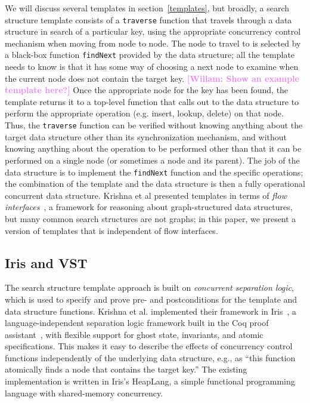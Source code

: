 \documentclass[a4paper,UKenglish,cleveref, autoref, thm-restate]{lipics-v2021}
\newcommand{\wm}[1]{\textbf{\textcolor{violet}{[Willam: #1]}}}
\begin{document}
We will discuss several templates in section~\ref{templates}, but broadly, a search structure template consists of a \lstinline{traverse} function that travels through a data structure in search of a particular key, using the appropriate concurrency control mechanism when moving from node to node. The node to travel to is selected by a black-box function \lstinline{findNext} provided by the data structure; all the template needs to know is that it has some way of choosing a next node to examine when the current node does not contain the target key. \wm{Show an example template here?} Once the appropriate node for the key has been found, the template returns it to a top-level function that calls out to the data structure to perform the appropriate operation (e.g. insert, lookup, delete) on that node. Thus, the \lstinline{traverse} function can be verified without knowing anything about the target data structure other than its synchronization mechanism, and without knowing anything about the operation to be performed other than that it can be performed on a single node (or sometimes a node and its parent). The job of the data structure is to implement the \lstinline{findNext} function and the specific operations; the combination of the template and the data structure is then a fully operational concurrent data structure. Krishna et al presented templates in terms of \emph{flow interfaces}~\cite{krishna2017flow}, a framework for reasoning about graph-structured data structures, but many common search structures are not graphs; in this paper, we present a version of templates that is independent of flow interfaces. %

\subsection{Iris and VST}
The search structure template approach is built on \emph{concurrent separation logic}, which is used to specify and prove pre- and postconditions for the template and data structure functions. Krishna et al. implemented their framework in Iris~\cite{iris}, a language-independent separation logic framework built in the Coq proof assistant~\cite{coq}, with flexible support for ghost state, invariants, and atomic specifications. This makes it easy to describe the effects of concurrency control functions independently of the underlying data structure, e.g., as ``this function atomically finds a node that contains the target key.'' %
The existing implementation is written in Iris's HeapLang, a simple functional programming language with shared-memory concurrency.
\end{document}
